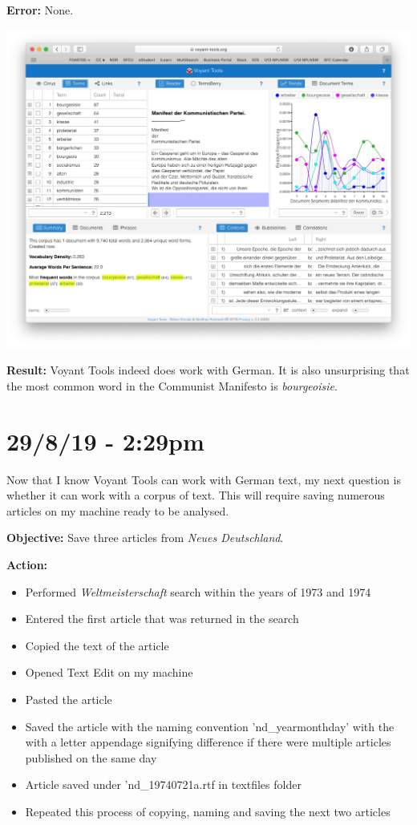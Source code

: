 \documentclass{article}
\begin{document}
\textbf{Error:} None.

\includegraphics[width=\textwidth]{bourgeoisie.png}

\textbf{Result:} Voyant Tools indeed does work with German. It is also unsurprising that the most common word in the Communist Manifesto is \textit{bourgeoisie}.

\section*{29/8/19 - 2:29pm}

Now that I know Voyant Tools can work with German text, my next question is whether it can work with a corpus of text. This will require saving numerous articles on my machine ready to be analysed.

\textbf{Objective:} Save three articles from \textit{Neues Deutschland}.

\textbf{Action:} 

\begin{itemize}
    \item Performed \textit{Weltmeisterschaft} search within the years of 1973 and 1974
    \item Entered the first article that was returned in the search
    \item Copied the text of the article
    \item Opened Text Edit on my machine
    \item Pasted the article
    \item Saved the article with the naming convention 'nd\_yearmonthday' with the with a letter appendage signifying difference if there were multiple articles published on the same day
    \item Article saved under 'nd\_19740721a.rtf in textfiles folder
    \item Repeated this process of copying, naming and saving the next two articles
\end{itemize}
\end{document}

